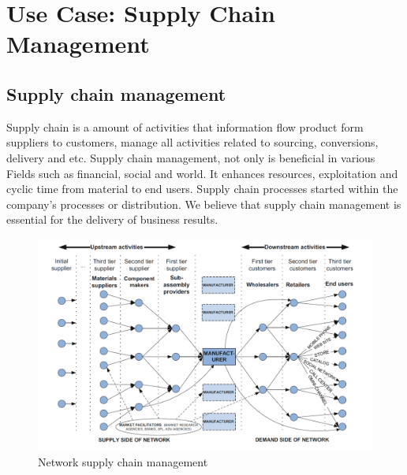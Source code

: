 \chapter{Use Case: Supply Chain Management}
\section{Supply chain management}
Supply chain is a amount of activities that information flow product form suppliers to customers, manage all activities related to sourcing, conversions, delivery and etc. Supply chain management, not only is beneficial in various Fields such as financial, social and world. It enhances resources, exploitation and cyclic time from material to end users.
Supply chain processes started within the company’s processes or distribution. We believe that supply chain management is essential for the delivery of business results\cite{Wu}.
\begin{center}
	\begin{figure}[htb!]
		\begin{minipage}{0.50\linewidth}
			
			\includegraphics[width=1.85\textwidth]{images/chap03_SCM_network.png}
		\end{minipage}
		\caption{Network supply chain management\cite{Sajter}}	
	\end{figure}	
\end{center}

